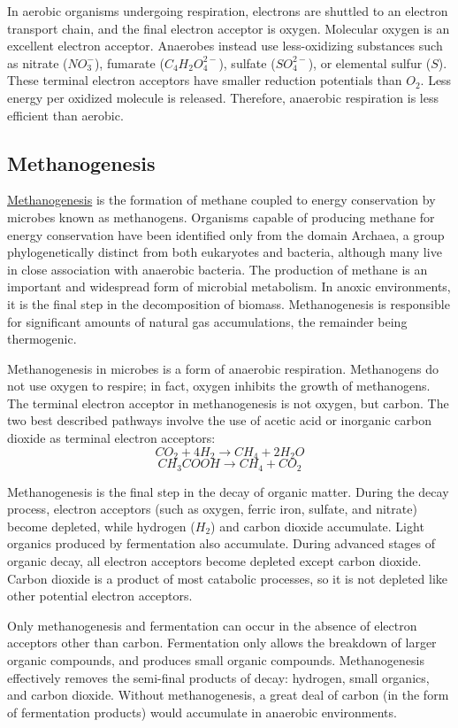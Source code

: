 \documentclass{article}
\begin{document}
In aerobic organisms undergoing respiration, electrons are shuttled to an electron
transport chain, and the final electron acceptor is oxygen. Molecular oxygen is an
excellent electron acceptor. Anaerobes instead use less-oxidizing substances such as
nitrate ($NO_3^-$), fumarate ($C_4H_2O_4^{2-}$), sulfate ($SO_4^{2-}$), or elemental
sulfur ($S$). These terminal electron acceptors have smaller reduction potentials than
$O_2$.  Less energy per oxidized molecule is released. Therefore, anaerobic respiration is
less efficient than aerobic.

\subsection{Methanogenesis}
\href{https://en.wikipedia.org/wiki/Methanogenesis}{Methanogenesis}
is the formation of methane coupled to energy conservation by microbes known as
methanogens. Organisms capable of producing methane for energy conservation have been
identified only from the domain Archaea, a group phylogenetically distinct from both
eukaryotes and bacteria, although many live in close association with anaerobic bacteria.
The production of methane is an important and widespread form of microbial metabolism. In
anoxic environments, it is the final step in the decomposition of biomass. Methanogenesis
is responsible for significant amounts of natural gas accumulations, the remainder being
thermogenic.

Methanogenesis in microbes is a form of anaerobic respiration. Methanogens do not use
oxygen to respire; in fact, oxygen inhibits the growth of methanogens. The terminal
electron acceptor in methanogenesis is not oxygen, but carbon. The two best described
pathways involve the use of acetic acid or inorganic carbon dioxide as terminal electron
acceptors:
\[
    CO_2 + 4 H_2 \rightarrow CH_4 + 2 H_2O
\]
\[
    CH_3COOH \rightarrow CH_4 + CO_2
\]

Methanogenesis is the final step in the decay of organic matter. During the decay process,
electron acceptors (such as oxygen, ferric iron, sulfate, and nitrate) become depleted,
while hydrogen ($H_2$) and carbon dioxide accumulate. Light organics produced by fermentation
also accumulate. During advanced stages of organic decay, all electron acceptors become
depleted except carbon dioxide. Carbon dioxide is a product of most catabolic processes,
so it is not depleted like other potential electron acceptors.

Only methanogenesis and fermentation can occur in the absence of electron acceptors other
than carbon. Fermentation only allows the breakdown of larger organic compounds, and
produces small organic compounds. Methanogenesis effectively removes the semi-final
products of decay: hydrogen, small organics, and carbon dioxide. Without methanogenesis, a
great deal of carbon (in the form of fermentation products) would accumulate in anaerobic
environments.
\end{document}

